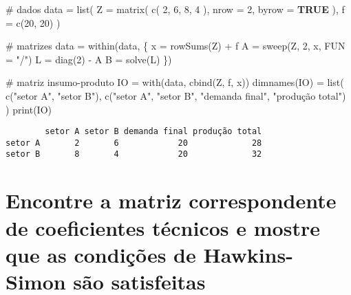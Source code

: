 \documentclass[
  letterpaper,
  DIV=11,
  numbers=noendperiod]{scrreprt}
\newenvironment{Shaded}{\begin{snugshade}}{\end{snugshade}}
\newcommand{\AttributeTok}[1]{\textcolor[rgb]{0.80,0.80,0.80}{#1}}
\newcommand{\CommentTok}[1]{\textcolor[rgb]{0.50,0.62,0.50}{#1}}
\newcommand{\ConstantTok}[1]{\textcolor[rgb]{0.86,0.64,0.64}{\textbf{#1}}}
\newcommand{\DecValTok}[1]{\textcolor[rgb]{0.86,0.86,0.80}{#1}}
\newcommand{\FunctionTok}[1]{\textcolor[rgb]{0.94,0.94,0.56}{#1}}
\newcommand{\NormalTok}[1]{\textcolor[rgb]{0.80,0.80,0.80}{#1}}
\newcommand{\OtherTok}[1]{\textcolor[rgb]{0.94,0.94,0.56}{#1}}
\newcommand{\SpecialCharTok}[1]{\textcolor[rgb]{0.86,0.64,0.64}{#1}}
\newcommand{\StringTok}[1]{\textcolor[rgb]{0.80,0.58,0.58}{#1}}
\begin{document}
\begin{Shaded}
\begin{Highlighting}[numbers=left,,]
\CommentTok{\# dados}
\NormalTok{data }\OtherTok{=} \FunctionTok{list}\NormalTok{(}
  \AttributeTok{Z =} \FunctionTok{matrix}\NormalTok{(}
    \FunctionTok{c}\NormalTok{(}
      \DecValTok{2}\NormalTok{, }\DecValTok{6}\NormalTok{,}
      \DecValTok{8}\NormalTok{, }\DecValTok{4}
\NormalTok{    ),}
    \AttributeTok{nrow =} \DecValTok{2}\NormalTok{,}
    \AttributeTok{byrow =} \ConstantTok{TRUE}
\NormalTok{  ),}
  \AttributeTok{f =} \FunctionTok{c}\NormalTok{(}\DecValTok{20}\NormalTok{, }\DecValTok{20}\NormalTok{)}
\NormalTok{)}

\CommentTok{\# matrizes}
\NormalTok{data }\OtherTok{=} \FunctionTok{within}\NormalTok{(data, \{}
\NormalTok{  x }\OtherTok{=} \FunctionTok{rowSums}\NormalTok{(Z) }\SpecialCharTok{+}\NormalTok{ f}
\NormalTok{  A }\OtherTok{=} \FunctionTok{sweep}\NormalTok{(Z, }\DecValTok{2}\NormalTok{, x, }\AttributeTok{FUN =} \StringTok{"/"}\NormalTok{)}
\NormalTok{  L }\OtherTok{=} \FunctionTok{diag}\NormalTok{(}\DecValTok{2}\NormalTok{) }\SpecialCharTok{{-}}\NormalTok{ A}
\NormalTok{  B }\OtherTok{=} \FunctionTok{solve}\NormalTok{(L)}
\NormalTok{\})}

\CommentTok{\# matriz insumo{-}produto}
\NormalTok{IO }\OtherTok{=} \FunctionTok{with}\NormalTok{(data, }\FunctionTok{cbind}\NormalTok{(Z, f, x))}
\FunctionTok{dimnames}\NormalTok{(IO) }\OtherTok{=} \FunctionTok{list}\NormalTok{(}
  \FunctionTok{c}\NormalTok{(}\StringTok{"setor A"}\NormalTok{, }\StringTok{"setor B"}\NormalTok{),}
  \FunctionTok{c}\NormalTok{(}\StringTok{"setor A"}\NormalTok{, }\StringTok{"setor B"}\NormalTok{, }\StringTok{"demanda final"}\NormalTok{, }\StringTok{"produção total"}\NormalTok{)}
\NormalTok{)}
\FunctionTok{print}\NormalTok{(IO)}
\end{Highlighting}
\end{Shaded}

\begin{verbatim}
        setor A setor B demanda final produção total
setor A       2       6            20             28
setor B       8       4            20             32
\end{verbatim}

\section{Encontre a matriz correspondente de coeficientes técnicos e
mostre que as condições de Hawkins-Simon são
satisfeitas}\label{encontre-a-matriz-correspondente-de-coeficientes-tuxe9cnicos-e-mostre-que-as-condiuxe7uxf5es-de-hawkins-simon-suxe3o-satisfeitas}
\end{document}
